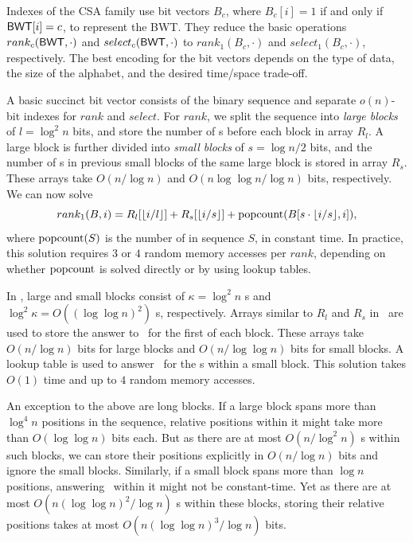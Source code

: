 Indexes of the CSA family use bit vectors $B_{c}$, where $B_{c}[i] = 1$ if and only if $\mathsf{BWT}[i] = c$, to represent the BWT. They reduce the basic operations $rank_{c}(\mathsf{BWT}, \cdot)$ and $select_{c}(\mathsf{BWT}, \cdot)$ to $rank_{1}(B_{c}, \cdot)$ and $select_{1}(B_{c}, \cdot)$, respectively. The best encoding for the bit vectors depends on the type of data, the size of the alphabet, and the desired time/space trade-off.

A basic succinct bit vector \cite{Jacobson1989,Munro1996,Clark1996} consists of the binary sequence and separate $o(n)$\nobreakdash-bit indexes for $rank$ and $select$. For $rank$, we split the sequence into \emph{large blocks} of $l = \log^{2} n$ bits, and store the number of \onebit{}s before each block in array $R_{l}$. A large block is further divided into \emph{small blocks} of $s = \log n / 2$ bits, and the number of \onebit{}s in previous small blocks of the same large block is stored in array $R_{s}$. These arrays take $O(n / \log n)$ and $O(n \log \log n / \log n)$ bits, respectively. We can now solve
$$
rank_{1}(B, i) = R_{l}[\lfloor i / l \rfloor] + R_{s}[\lfloor i / s \rfloor] + \operatorname{popcount}(B[s \cdot \lfloor i / s \rfloor, i]),
$$
where $\operatorname{popcount}(S)$ is the number of  in sequence $S$, in constant time. In practice, this solution requires $3$ or $4$ random memory accesses per $rank$, depending on whether $\operatorname{popcount}$ is solved directly or by using lookup tables.

In \select, large and small blocks consist of $\kappa = \log^{2} n$ \onebit{}s and $\log^{2} \kappa = O((\log \log n)^{2})$ \onebit{}s, respectively. Arrays similar to $R_{l}$ and $R_{s}$ in \rank\ are used to store the answer to \select\ for the first \onebit{} of each block. These arrays take $O(n / \log n)$ bits for large blocks and $O(n / \log \log n)$ bits for small blocks. A lookup table is used to answer \select\ for the \onebit{}s within a small block. This solution takes $O(1)$ time and up to $4$ random memory accesses.

An exception to the above are long blocks. If a large block spans more than $\log^{4} n$ positions in the sequence, relative positions within it might take more than $O(\log \log n)$ bits each. But as there are at most $O(n / \log^{2} n)$ \onebit{}s within such blocks, we can store their positions explicitly in $O(n / \log n)$ bits and ignore the small blocks. Similarly, if a small block spans more than $\log n$ positions, answering \select\ within it might not be constant-time. Yet as there are at most $O(n (\log \log n)^{2} / \log n)$ \onebit{}s within these blocks, storing their relative positions takes at most $O(n (\log \log n)^{3} / \log n)$ bits.


